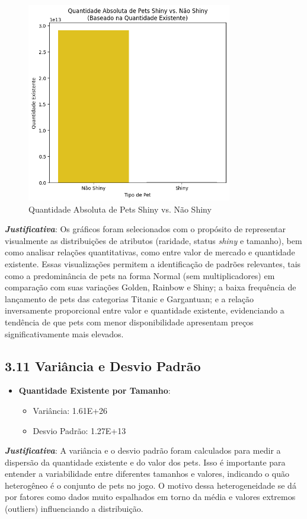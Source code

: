 \documentclass[12pt]{article}
\begin{document}
\begin{itemize}
\begin{figure}[H]
         \centering
         \includegraphics[width=0.8\textwidth]{grafico5.png}
         \caption{Quantidade Absoluta de Pets Shiny vs. Não Shiny}
     \end{figure}   
\end{itemize}
\textbf{\textit{Justificativa}}: Os gráficos foram selecionados com o propósito de representar visualmente as distribuições de atributos (raridade, status \textit{shiny} e tamanho), bem como analisar relações quantitativas, como entre valor de mercado e quantidade existente. Essas visualizações permitem a identificação de padrões relevantes, tais como a predominância de pets na forma Normal (sem multiplicadores) em comparação com suas variações Golden, Rainbow e Shiny; a baixa frequência de lançamento de pets das categorias Titanic e Gargantuan; e a relação inversamente proporcional entre valor e quantidade existente, evidenciando a tendência de que pets com menor disponibilidade apresentam preços significativamente mais elevados.

\subsection*{3.11 Variância e Desvio Padrão}
\begin{itemize}
    \item \textbf{Quantidade Existente por Tamanho}:
    \begin{itemize}
        \item Variância: 1.61E+26
        \item Desvio Padrão: 1.27E+13
    \end{itemize}
\end{itemize}
\textbf{\textit{Justificativa}}: A variância e o desvio padrão foram calculados para medir a dispersão da quantidade existente e do valor dos pets. Isso é importante para entender a variabilidade entre diferentes tamanhos e valores, indicando o quão heterogêneo é o conjunto de pets no jogo. O motivo dessa heterogeneidade se dá por fatores como dados muito espalhados em torno da média e valores extremos (outliers) influenciando a distribuição.
\end{document}
